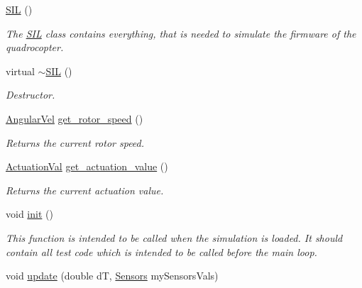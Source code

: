 \begin{DoxyCompactItemize}
\item 
\hypertarget{classSIL_a0e195277d2e26a6ce681b1d84dbe72a6}{\hyperlink{classSIL_a0e195277d2e26a6ce681b1d84dbe72a6}{\-S\-I\-L} ()}\label{classSIL_a0e195277d2e26a6ce681b1d84dbe72a6}

\begin{DoxyCompactList}\small\item\em \-The \hyperlink{classSIL}{\-S\-I\-L} class contains everything, that is needed to simulate the firmware of the quadrocopter. \end{DoxyCompactList}\item 
\hypertarget{classSIL_aa9c8c439c3fa725fe59f2245c274a369}{virtual \hyperlink{classSIL_aa9c8c439c3fa725fe59f2245c274a369}{$\sim$\-S\-I\-L} ()}\label{classSIL_aa9c8c439c3fa725fe59f2245c274a369}

\begin{DoxyCompactList}\small\item\em \-Destructor. \end{DoxyCompactList}\item 
\hyperlink{classAngularVel}{\-Angular\-Vel} \hyperlink{classSIL_a15370199edeb534b96ac2fb7fc97362a}{get\-\_\-rotor\-\_\-speed} ()
\begin{DoxyCompactList}\small\item\em \-Returns the current rotor speed. \end{DoxyCompactList}\item 
\hyperlink{classActuationVal}{\-Actuation\-Val} \hyperlink{classSIL_ad61155d21c843c82a40e7a0143ba15a7}{get\-\_\-actuation\-\_\-value} ()
\begin{DoxyCompactList}\small\item\em \-Returns the current actuation value. \end{DoxyCompactList}\item 
\hypertarget{classSIL_ae46ca96d637be59877af11d0ec661bb0}{void \hyperlink{classSIL_ae46ca96d637be59877af11d0ec661bb0}{init} ()}\label{classSIL_ae46ca96d637be59877af11d0ec661bb0}

\begin{DoxyCompactList}\small\item\em \-This function is intended to be called when the simulation is loaded. \-It should contain all test code which is intended to be called before the main loop. \end{DoxyCompactList}\item 
void \hyperlink{classSIL_a6a7c1fe2a8b2e251c392569129fc06ea}{update} (double d\-T, \hyperlink{classSensors}{\-Sensors} my\-Sensors\-Vals)
\end{DoxyCompactItemize}
